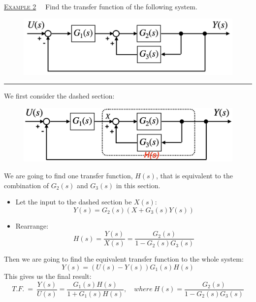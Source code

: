 \documentclass[12pt,a4paper]{article}
\begin{document}
\begin{tcolorbox}[breakable] %
\underline{\textsc{Example 2}} \ \ Find the transfer function of the following system.
\begin{figure}[H] \centering
\includegraphics[width=.65\textwidth]{images/BD2.png}
\end{figure}
\hrule \vspace{.3cm} 
We first consider the dashed section: 
\begin{figure}[H] \centering
\includegraphics[width=.5\textwidth]{images/BD2_dashed.png}
\end{figure}
We are going to find one transfer function, $H(s)$, that is equivalent to the combination of $G_{2}(s)$ and $G_{3}(s)$ in this section.
\begin{itemize}
\item Let the input to the dashed section be $X(s)$:
\[Y(s) = G_{2}(s)(X+G_{3}(s)Y(s))\]
\item Rearrange:
\[H(s) = \frac{Y(s)}{X(s)} = \frac{G_{2}(s)}{1-G_{2}(s)G_{3}(s)}\]
\end{itemize}
Then we are going to find the equivalent transfer function to the whole system:
\[Y(s) =(U(s)-Y(s))G_{1}(s)H(s)\]
This gives us the final result:
\[T.F. \ = \ \frac{Y(s)}{U(s)} = \frac{G_{1}(s)H(s)}{1+G_{1}(s)H(s)}, \quad where \ H(s) = \frac{G_{2}(s)}{1-G_{2}(s)G_{3}(s)}\]
\end{tcolorbox}

\newpage
\end{document}

